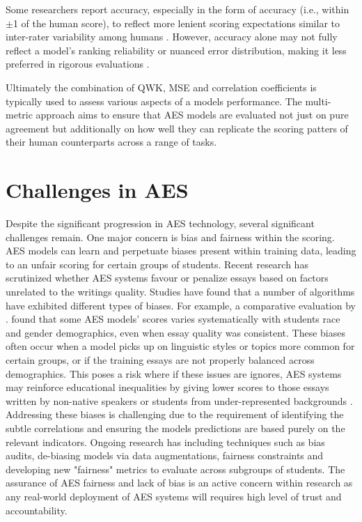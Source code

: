\documentclass[12pt,a4paper]{report}
\begin{document}
Some researchers report accuracy, especially in the form of  accuracy (i.e., within $\pm$1 of the human score), to reflect more lenient scoring expectations similar to inter-rater variability among humans \citep{Shermis2013,taghipour2016neural}. However, accuracy alone may not fully reflect a model’s ranking reliability or nuanced error distribution, making it less preferred in rigorous evaluations 
\citep{Williamson2012,Yannakoudakis2011}.

Ultimately the combination of QWK, MSE and correlation coefficients is typically used to assess various aspects of a models performance. The multi-metric approach aims to ensure that AES models are evaluated not just on pure agreement but additionally on how well they can replicate the scoring patters of their human counterparts across a range of tasks.

\section{Challenges in AES}
Despite the significant progression in AES technology, several significant challenges remain. One major concern is bias and fairness within the scoring. AES models can learn and perpetuate biases present within training data, leading to an unfair scoring for certain groups of students. Recent research has scrutinized whether AES systems favour or penalize essays based on factors unrelated 
to the writings quality. Studies have found that a number of algorithms have exhibited different types of biases. For example, a comparative evaluation by \citep{litman2024fairness}. found that some AES models' scores varies systematically with students race and gender demographics, even when essay quality was consistent. These biases often occur when a model picks up on linguistic styles or topics 
more common for certain groups, or if the training essays are not properly balanced across demographics. This poses a risk where if these issues are ignores, AES systems may reinforce educational inequalities by giving lower scores to those essays written by non-native speakers or students from under-represented backgrounds \citep{blodgett2020language}. Addressing these biases is challenging due to the requirement of identifying the subtle correlations and ensuring the models predictions are based purely on the relevant indicators. Ongoing research has including techniques such as bias audits, de-biasing models via data augmentations, fairness constraints and developing new "fairness" metrics to evaluate across subgroups of students. The assurance of AES fairness and lack of bias is an active concern within research as any real-world deployment of AES systems will requires high level of trust and accountability.
\end{document}
